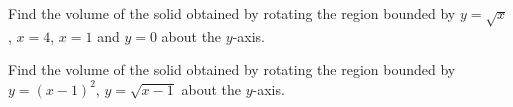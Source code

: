 \documentclass[../main.tex]{subfiles}
\begin{document}
\begin{exercise} \label{ex:volume-sqrt-x-about-y-axis}
  Find the volume of the solid obtained by rotating the region bounded by \(y = \sqrt{x}\), \(x = 4\), \(x=1\) and \(y = 0\) about the \(y\)-axis. 

\end{exercise}
\clearpage

\begin{exercise} \label{ex:volume-two-curves-about-y-axis}
  Find the volume of the solid obtained by rotating the region bounded by \(y = (x-1)^{2}\), \(y = \sqrt{x-1}\) about the \(y\)-axis.

\end{exercise}
\clearpage
\end{document}
